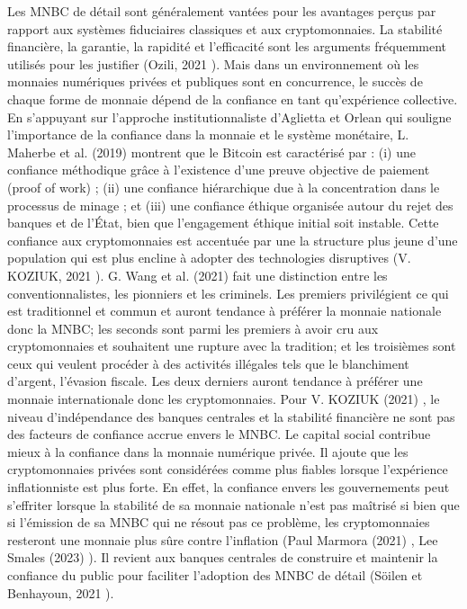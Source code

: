 \documentclass[12pt]{article}
\begin{document}
Les MNBC de détail sont généralement vantées pour les avantages perçus par rapport aux systèmes fiduciaires classiques et aux cryptomonnaies. La stabilité financière, la garantie, la rapidité et l'efficacité sont les arguments fréquemment utilisés pour les justifier (Ozili, 2021 \cite{Ozili2021Central}). Mais dans un environnement où les monnaies numériques privées et publiques sont en concurrence, le succès de chaque forme de monnaie dépend de la confiance en tant qu'expérience collective. En s'appuyant sur l'approche institutionnaliste d'Aglietta et Orlean qui souligne l'importance de la confiance dans la monnaie et le système monétaire, L. Maherbe et al. (2019) \cite{malherbe_cryptocurrencies_2019} montrent que le Bitcoin est caractérisé par : (i) une confiance méthodique grâce à l'existence d'une preuve objective de paiement (proof of work) ; (ii) une confiance hiérarchique due à la concentration dans le processus de minage ; et (iii) une confiance éthique organisée autour du rejet des banques et de l'État, bien que l'engagement éthique initial soit instable. Cette confiance aux cryptomonnaies est accentuée par une la structure plus jeune d'une population qui est plus encline à adopter des technologies disruptives (V. KOZIUK, 2021 \cite{Koziuk2021Digital}). G. Wang et al. (2021) \cite{wang_conventionalists_2021} fait une distinction entre les conventionnalistes, les pionniers et les criminels. Les premiers privilégient ce qui est traditionnel et commun et auront tendance à préférer la monnaie nationale donc la MNBC; les seconds sont parmi les premiers à avoir cru aux cryptomonnaies et souhaitent une rupture avec la tradition; et les troisièmes sont ceux qui veulent procéder à des activités illégales tels que le blanchiment d'argent, l'évasion fiscale. Les deux derniers auront tendance à préférer une monnaie internationale donc les cryptomonnaies. Pour V. KOZIUK (2021) \cite{Koziuk2021Digital}, le niveau d'indépendance des banques centrales et la stabilité financière ne sont pas des facteurs de confiance accrue envers le MNBC. Le capital social contribue mieux à la confiance dans la monnaie numérique privée. Il ajoute que les cryptomonnaies privées sont considérées comme plus fiables lorsque l'expérience inflationniste est plus forte. En effet, la confiance envers les gouvernements peut s'effriter lorsque la stabilité de sa monnaie nationale n'est pas maîtrisé si bien que si l'émission de sa MNBC qui ne résout pas ce problème, les cryptomonnaies resteront une monnaie plus sûre contre l'inflation (Paul Marmora (2021) \cite{marmora_currency_2021}, Lee Smales (2023) \cite{smales_cryptocurrency_2023}). Il revient aux banques centrales de construire et maintenir la confiance du public pour faciliter l'adoption des MNBC de détail (Söilen et Benhayoun, 2021 \cite{Söilen2021Household}).
\end{document}
